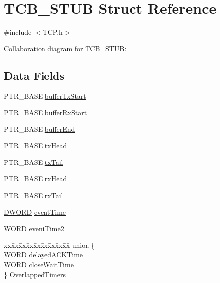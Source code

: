 \hypertarget{struct_t_c_b___s_t_u_b}{}\section{T\+C\+B\+\_\+\+S\+T\+U\+B Struct Reference}
\label{struct_t_c_b___s_t_u_b}


{\ttfamily \#include $<$T\+C\+P.\+h$>$}



Collaboration diagram for T\+C\+B\+\_\+\+S\+T\+U\+B\+:
\subsection*{Data Fields}
\begin{DoxyCompactItemize}
\item 
P\+T\+R\+\_\+\+B\+A\+S\+E \hyperlink{struct_t_c_b___s_t_u_b_abc0d9a5c1aa719e758931a78344b3e99}{buffer\+Tx\+Start}
\item 
P\+T\+R\+\_\+\+B\+A\+S\+E \hyperlink{struct_t_c_b___s_t_u_b_aee1387d217595a005d8b74e262d76db0}{buffer\+Rx\+Start}
\item 
P\+T\+R\+\_\+\+B\+A\+S\+E \hyperlink{struct_t_c_b___s_t_u_b_a56e0df836febac47f2f7f905f0641260}{buffer\+End}
\item 
P\+T\+R\+\_\+\+B\+A\+S\+E \hyperlink{struct_t_c_b___s_t_u_b_ab75bc52ffa39337edf7b3880d1febbfc}{tx\+Head}
\item 
P\+T\+R\+\_\+\+B\+A\+S\+E \hyperlink{struct_t_c_b___s_t_u_b_a99e571c03a1088175fdde4286cb4056a}{tx\+Tail}
\item 
P\+T\+R\+\_\+\+B\+A\+S\+E \hyperlink{struct_t_c_b___s_t_u_b_a75dd4a8683dde17aa7f3de43bbdc4e13}{rx\+Head}
\item 
P\+T\+R\+\_\+\+B\+A\+S\+E \hyperlink{struct_t_c_b___s_t_u_b_adfd9b628a5f15aec8aacd007d4fddae0}{rx\+Tail}
\item 
\hyperlink{_generic_type_defs_8h_ad342ac907eb044443153a22f964bf0af}{D\+W\+O\+R\+D} \hyperlink{struct_t_c_b___s_t_u_b_a2ec4952d1b77ec5800649853e0d95c65}{event\+Time}
\item 
\hyperlink{_generic_type_defs_8h_a2b0e863dadf920709ec53d9088ee7c91}{W\+O\+R\+D} \hyperlink{struct_t_c_b___s_t_u_b_a4f359317ed99210951551eaaa243d2b1}{event\+Time2}
\item 
\begin{tabbing}
xx\=xx\=xx\=xx\=xx\=xx\=xx\=xx\=xx\=\kill
union \{\\
\>\hyperlink{_generic_type_defs_8h_a2b0e863dadf920709ec53d9088ee7c91}{WORD} \hyperlink{struct_t_c_b___s_t_u_b_ac42d764ddec4dd25aab3d65a9a415753}{delayedACKTime}\\
\>\hyperlink{_generic_type_defs_8h_a2b0e863dadf920709ec53d9088ee7c91}{WORD} \hyperlink{struct_t_c_b___s_t_u_b_adbf3a5a42e98b90ba8a87652e0b9099e}{closeWaitTime}\\
\} \hyperlink{struct_t_c_b___s_t_u_b_ad7a32728d33041b932eab132ddec9a6f}{OverlappedTimers}\\


\end{tabbing}
\end{DoxyCompactItemize}
